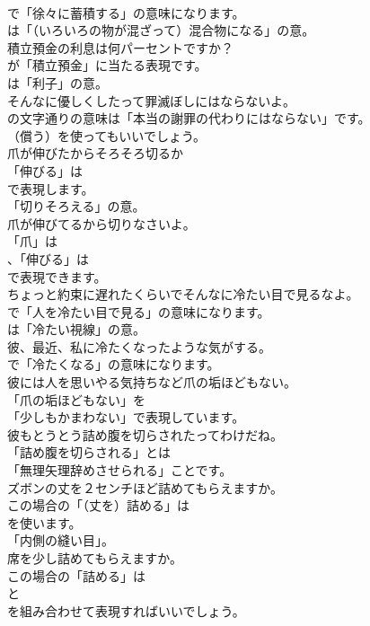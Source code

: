 \documentclass[8pt]{extreport}
\begin{document}
\begin{CJK}{UTF8}{min}
\\	で「徐々に蓄積する」の意味になります。
\\	は「（いろいろの物が混ざって）混合物になる」の意。	
\\	積立預金の利息は何パーセントですか？ 
\\	が「積立預金」に当たる表現です。
\\	は「利子」の意。	
\\	そんなに優しくしたって罪滅ぼしにはならないよ。 
\\	の文字通りの意味は「本当の謝罪の代わりにはならない」です。
\\	（償う）を使ってもいいでしょう。	
\\	爪が伸びたからそろそろ切るか 
\\	「伸びる」は
\\	で表現します。
\\	「切りそろえる」の意。	
\\	爪が伸びてるから切りなさいよ。 
\\	「爪」は
\\	、「伸びる」は
\\	で表現できます。	
\\	ちょっと約束に遅れたくらいでそんなに冷たい目で見るなよ。 
\\	で「人を冷たい目で見る」の意味になります。
\\	は「冷たい視線」の意。	
\\	彼、最近、私に冷たくなったような気がする。 
\\	で「冷たくなる」の意味になります。	
\\	彼には人を思いやる気持ちなど爪の垢ほどもない。 
\\	「爪の垢ほどもない」を
\\	「少しもかまわない」で表現しています。	
\\	彼もとうとう詰め腹を切らされたってわけだね。 
\\	「詰め腹を切らされる」とは
\\	「無理矢理辞めさせられる」ことです。	
\\	ズボンの丈を２センチほど詰めてもらえますか。 
\\	この場合の「（丈を）詰める」は
\\	を使います。
\\	「内側の縫い目」。	
\\	席を少し詰めてもらえますか。 
\\	この場合の「詰める」は
\\	と
\\	を組み合わせて表現すればいいでしょう。	

\end{CJK}
\end{document}
